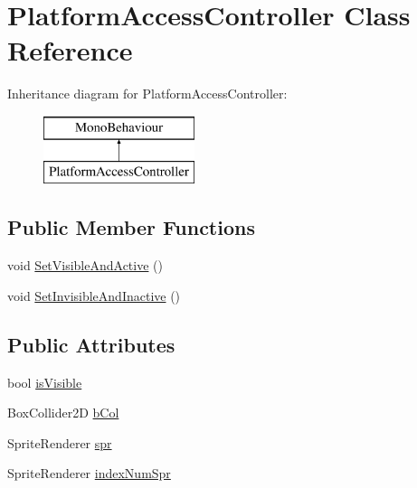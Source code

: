 \hypertarget{class_platform_access_controller}{}\section{Platform\+Access\+Controller Class Reference}
\label{class_platform_access_controller}
Inheritance diagram for Platform\+Access\+Controller\+:\begin{figure}[H]
\begin{center}
\leavevmode
\includegraphics[height=2.000000cm]{class_platform_access_controller}
\end{center}
\end{figure}
\subsection*{Public Member Functions}
\begin{DoxyCompactItemize}
\item 
void \hyperlink{class_platform_access_controller_a3999dc4cf501e3092bf06662e215afaf}{Set\+Visible\+And\+Active} ()
\item 
void \hyperlink{class_platform_access_controller_adae7a500e267262f6262b9997fb7e9d4}{Set\+Invisible\+And\+Inactive} ()
\end{DoxyCompactItemize}
\subsection*{Public Attributes}
\begin{DoxyCompactItemize}
\item 
bool \hyperlink{class_platform_access_controller_ae61d142d689e9436ffcdd42ae258b74b}{is\+Visible}
\item 
Box\+Collider2D \hyperlink{class_platform_access_controller_a7e71633a42a42bd944656b6b31da7018}{b\+Col}
\item 
Sprite\+Renderer \hyperlink{class_platform_access_controller_a148223f08e156ce2c3cbf9b87feb83d2}{spr}
\item 
Sprite\+Renderer \hyperlink{class_platform_access_controller_a96b290b37dd60e9c78015b86c94ffbe7}{index\+Num\+Spr}
\end{DoxyCompactItemize}



